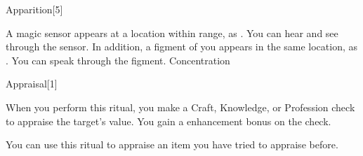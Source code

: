 \begin{spellsection}{Apparition}[5]
    \begin{spellheader}
    \end{spellheader}
    \begin{spellcontent}
        \begin{spelltargetinginfo}
            \spellrng{\rngext \rngunrestricted}
        \end{spelltargetinginfo}
        \begin{spelleffects}

            \spellline
            \spelleffect A magic sensor appears at a location within range, as . You can hear and see through the sensor. In addition, a figment of you appears in the same location, as . You can speak through the figment.
            \spelldur Concentration
        \end{spelleffects}
    \end{spellcontent}
    \begin{spellfooter}
        \spellnotes \sensorspellnotes
    \end{spellfooter}
\end{spellsection}

\begin{spellsection}{Appraisal}[1]
    \begin{spellheader}
    \end{spellheader}
    \begin{spellcontent}
        \begin{spelltargetinginfo}
            \spellrng{\rngtouch}
        \end{spelltargetinginfo}
        \begin{spelleffects}

            \spelleffect When you perform this ritual, you make a Craft, Knowledge, or Profession check to appraise the target's value. You gain a  enhancement bonus on the check.
        \end{spelleffects}
    \end{spellcontent}
    \begin{spellfooter}
        \spellnotes You can use this ritual to appraise an item you have tried to appraise before.
    \end{spellfooter}
\end{spellsection}

